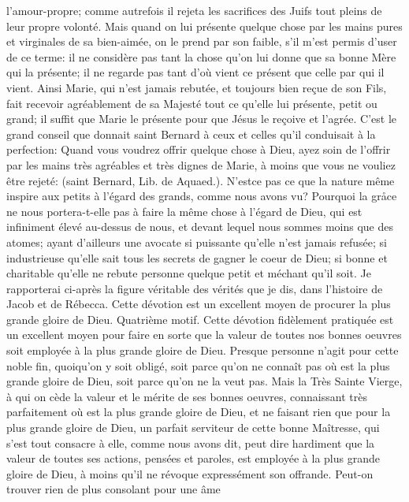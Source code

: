 l'amour-propre; comme autrefois il rejeta les sacrifices des Juifs tout pleins de leur propre volonté. Mais quand on
lui présente quelque chose par les mains pures et virginales de sa bien-aimée, on le prend par son faible, s'il m'est
permis d'user de ce terme: il ne considère pas tant la chose qu'on lui donne que sa bonne Mère qui la présente; il
ne regarde pas tant d'où vient ce présent que celle par qui il vient. Ainsi Marie, qui n'est jamais rebutée, et toujours
bien reçue de son Fils, fait recevoir agréablement de sa Majesté tout ce qu'elle lui présente, petit ou grand; il suffit
que Marie le présente pour que Jésus le reçoive et l'agrée. C'est le grand conseil que donnait saint Bernard à ceux
et celles qu'il conduisait à la perfection: Quand vous voudrez offrir quelque chose à Dieu, ayez soin de l'offrir par
les mains très agréables et très dignes de Marie, à moins que vous ne vouliez être rejeté:  (saint Bernard, Lib. de
Aquaed.).
 N'estce pas ce que la nature même inspire aux petits à l'égard des grands, comme nous avons vu? Pourquoi
la gråce ne nous portera-t-elle pas à faire la même chose à l'égard de Dieu, qui est infiniment élevé au-dessus de
nous, et devant lequel nous sommes moins que des atomes; ayant d'ailleurs une avocate si puissante qu'elle n'est
jamais refusée; si industrieuse qu'elle sait tous les secrets de gagner le coeur de Dieu; si bonne et charitable
qu'elle ne rebute personne quelque petit et méchant qu'il soit. Je rapporterai ci-après la figure véritable des vérités
que je dis, dans l'histoire de Jacob et de Rébecca.
Cette dévotion est un excellent moyen
de procurer la plus grande gloire de Dieu.
 Quatrième motif. Cette dévotion fidèlement pratiquée est un excellent moyen pour faire en sorte que la valeur
de toutes nos bonnes oeuvres soit employée à la plus grande gloire de Dieu. Presque personne n'agit pour cette
noble fin, quoiqu'on y soit obligé, soit parce qu'on ne connaît pas où est la plus grande gloire de Dieu, soit parce
qu'on ne la veut pas. Mais la Très Sainte Vierge, à qui on cède la valeur et le mérite de ses bonnes oeuvres,
connaissant très parfaitement où est la plus grande gloire de Dieu, et ne faisant rien que pour la plus grande gloire
de Dieu, un parfait serviteur de cette bonne Maîtresse, qui s'est tout consacre à elle, comme nous avons dit, peut
dire hardiment que la valeur de toutes ses actions, pensées et paroles, est employée à la plus grande gloire de
Dieu, à moins qu'il ne révoque expressément son offrande. Peut-on trouver rien de plus consolant pour une âme

